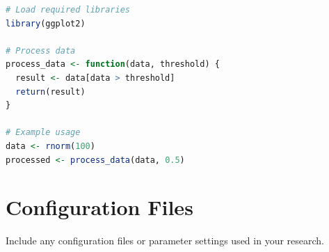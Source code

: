 \begin{lstlisting}[language=R, caption=Example R code]
# Load required libraries
library(ggplot2)

# Process data
process_data <- function(data, threshold) {
  result <- data[data > threshold]
  return(result)
}

# Example usage
data <- rnorm(100)
processed <- process_data(data, 0.5)
\end{lstlisting}

\section{Configuration Files}

Include any configuration files or parameter settings used in your research.
